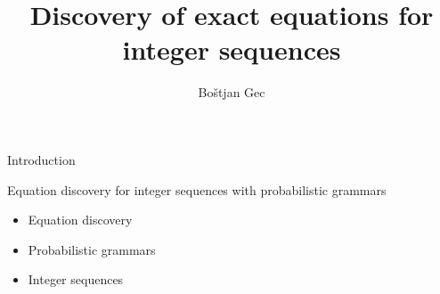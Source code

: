 \documentclass[t,usenames,dvipsnames]{beamer} %
\title{Discovery of exact equations for integer sequences}
\author{Boštjan Gec}
\institute{mentor: prof. dr. Ljupčo Todorovski}
\newcommand{\1}{\boldsymbol{1}}
\newcommand{\0}{\boldsymbol{0}}
\begin{document}
\begin{frame}
  \maketitle
\end{frame}



\begin{frame}{Introduction}
\begin{block}{Equation discovery for integer sequences with probabilistic grammars}
\begin{itemize}
	\item Equation discovery
	\item Probabilistic grammars
	\item Integer sequences
\end{itemize}
\end{block}
\end{frame}


\end{document}
